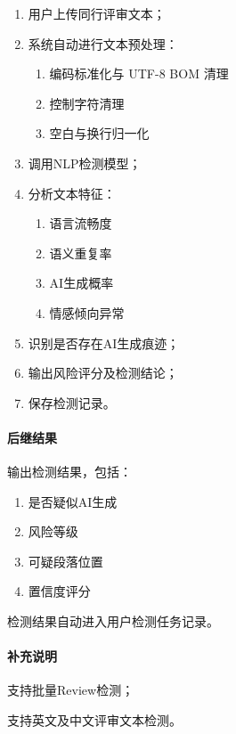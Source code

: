 \begin{enumerate}
    \item 用户上传同行评审文本；
    \item 系统自动进行文本预处理：
    \begin{enumerate}
        \item 编码标准化与 UTF-8 BOM 清理
        \item 控制字符清理
        \item 空白与换行归一化
    \end{enumerate}
    \item 调用NLP检测模型；
    \item 分析文本特征：
    \begin{enumerate}
        \item 语言流畅度
        \item 语义重复率
        \item AI生成概率
        \item 情感倾向异常
    \end{enumerate}
    \item 识别是否存在AI生成痕迹；
    \item 输出风险评分及检测结论；
    \item 保存检测记录。
\end{enumerate}

\paragraph*{后继结果}

输出检测结果，包括：

\begin{enumerate}
    \item 是否疑似AI生成
    \item 风险等级
    \item 可疑段落位置
    \item 置信度评分
\end{enumerate}

检测结果自动进入用户检测任务记录。

\paragraph*{补充说明}

支持批量Review检测；

支持英文及中文评审文本检测。

\subsubsection{}

